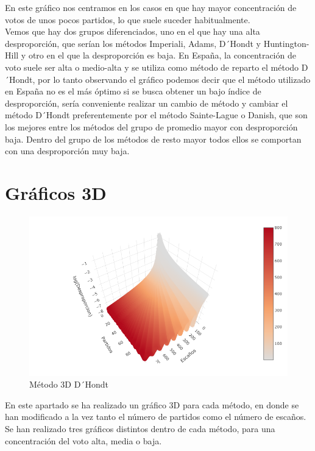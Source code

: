 \documentclass[12pt,a4paper,]{book}
\numberwithin{dummy}{section}
\theoremstyle{ocrenumbox}
\theoremstyle{blacknumex}
\theoremstyle{blacknumbox}
\theoremstyle{ocrenum}
\theoremstyle{ocrenum}
\begin{document}
En este gráfico nos centramos en los casos en que hay mayor
concentración de votos de unos pocos partidos, lo que suele suceder
habitualmente.\\
Vemos que hay dos grupos diferenciados, uno en el que hay una alta
desproporción, que serían los métodos Imperiali, Adams, D´Hondt y
Huntington-Hill y otro en el que la desproporción es baja. En España, la
concentración de voto suele ser alta o medio-alta y se utiliza como
método de reparto el método D´Hondt, por lo tanto observando el gráfico
podemos decir que el método utilizado en España no es el más óptimo si
se busca obtener un bajo índice de desproporción, sería conveniente
realizar un cambio de método y cambiar el método D´Hondt preferentemente
por el método Sainte-Lague o Danish, que son los mejores entre los
métodos del grupo de promedio mayor con desproporción baja. Dentro del
grupo de los métodos de resto mayor todos ellos se comportan con una
desproporción muy baja.

\hypertarget{gruxe1ficos-3d}{%
\section{Gráficos 3D}\label{gruxe1ficos-3d}}

\begin{figure}[H]

{\centering \includegraphics[width=0.95\linewidth]{graficos/dont_despro_bajo} 

}

\caption{Método 3D D´Hondt}\label{fig:graf3d}
\end{figure}

En este apartado se ha realizado un gráfico 3D para cada método, en
donde se han modificado a la vez tanto el número de partidos como el
número de escaños. Se han realizado tres gráficos distintos dentro de
cada método, para una concentración del voto alta, media o baja.
\end{document}
